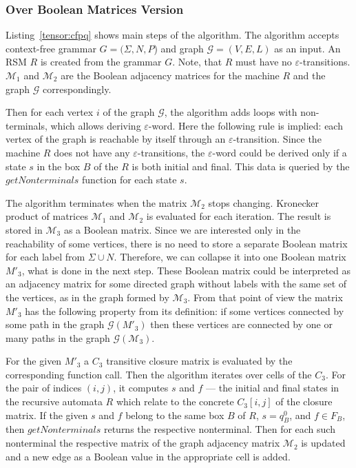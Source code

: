 
\subsubsection{Over Boolean Matrices Version}
Listing~\ref{tensor:cfpq} shows main steps of the algorithm.
The algorithm accepts context-free grammar $G=(\Sigma,N,P$) and graph $\mathcal{G}=(V,E,L)$ as an input.
An RSM $R$ is created from the grammar $G$.
Note, that $R$ must have no $\varepsilon$-transitions.
$\mathcal{M}_1$ and $\mathcal{M}_2$ are the Boolean adjacency matrices for the machine 
$R$ and the graph $\mathcal{G}$ correspondingly.

Then for each vertex $i$ of the graph $\mathcal{G}$, the algorithm adds loops 
with non-terminals, which allows deriving $\varepsilon$-word.
Here the following rule is implied: each vertex of the graph is reachable 
by itself through an $\varepsilon$-transition. Since the machine $R$ does 
not have any $\varepsilon$-transitions, the $\varepsilon$-word could be 
derived only if a state $s$ in the box $B$ of the $R$ is both initial and final.
This data is queried by the $getNonterminals$ function for each state $s$.

The algorithm terminates when the matrix $\mathcal{M}_2$ stops changing.
Kronecker product of matrices $\mathcal{M}_1$ and $\mathcal{M}_2$ is evaluated
for each iteration.
The result is stored in $\mathcal{M}_3$ as a Boolean matrix. Since we are interested
only in the reachability of some vertices, there is no need to store a separate
Boolean matrix for each label from $\Sigma \cup N$. Therefore, we can 
collapse it into one Boolean matrix $M'_3$, what is done in the next step.
These Boolean matrix could be interpreted as an adjacency matrix for some directed graph
without labels with the same set of the vertices, as in the graph formed by $\mathcal{M}_3$.
From that point of view the matrix $M'_3$ has the following property 
from its definition: if some vertices connected by some path in the graph $\mathcal{G}(M'_3)$ then these vertices are
connected by one or many paths in the graph $\mathcal{G}(\mathcal{M}_3)$.

For the given $M'_3$ a $C_3$ transitive closure matrix
is evaluated by the corresponding function call. 
Then the algorithm iterates over cells of the $C_3$.
For the pair of indices $(i,j)$, it computes $s$ and $f$ --- 
the initial and final states in the recursive automata $R$ which relate 
to the concrete $C_3[i,j]$ of the closure matrix.
If the given $s$ and $f$ belong to the same box $B$ of $R$, $s = q_B^0$, 
and $f \in F_B$, then $getNonterminals$ returns the respective nonterminal.
Then for each such nonterminal the respective matrix of the graph adjacency 
matrix $\mathcal{M}_2$ is updated and a new edge as a Boolean value in the 
appropriate cell is added.

